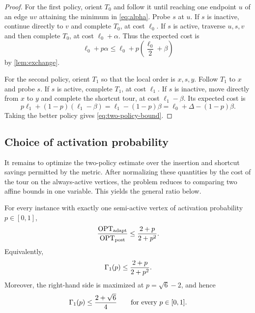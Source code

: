 \documentclass[12pt,a4paper,oneside]{report}
\begin{document}
\begin{proof}
For the first policy, orient $T_0$ and follow it until reaching one endpoint
$u$ of an edge $uv$ attaining the minimum in \cref{eq:alpha}.  Probe $s$ at
$u$.  If $s$ is inactive, continue directly to $v$ and complete $T_0$, at cost
$\ell_0$.  If $s$ is active, traverse $u,s,v$ and then complete $T_0$, at cost
$\ell_0+\alpha$.  Thus the expected cost is
\[
  \ell_0+p\alpha
  \le \ell_0+p\left(\frac{\ell_0}{2}+\beta\right)
\]
by \cref{lem:exchange}.

For the second policy, orient $T_1$ so that the local order is
$x,s,y$.  Follow $T_1$ to $x$ and probe $s$.  If $s$ is active, complete
$T_1$, at cost $\ell_1$.  If $s$ is inactive, move directly from $x$ to $y$ and
complete the shortcut tour, at cost $\ell_1-\beta$.  Its expected cost is
\[
  p\ell_1+(1-p)(\ell_1-\beta)
  =\ell_1-(1-p)\beta
  =\ell_0+\Delta-(1-p)\beta.
\]
Taking the better policy gives \cref{eq:two-policy-bound}.
\end{proof}

\subsection{Choice of activation probability}\label{sec:one-stochastic-optimization}

It remains to optimize the two-policy estimate over the insertion and
shortcut savings permitted by the metric.  After normalizing these quantities
by the cost of the tour on the always-active vertices, the problem reduces to
comparing two affine bounds in one variable.  This yields the general ratio
below.

\begin{theorem}\label{thm:general-upper}
For every instance with exactly one semi-active vertex of activation
probability $p\in[0,1]$,
\[
  \frac{\operatorname{OPT}_\mathrm{adapt}}{\operatorname{OPT}_\mathrm{post}}
  \le\frac{2+p}{2+p^2}.
\]
Equivalently,
\[
  \Gamma_{1}(p)\le\frac{2+p}{2+p^2}.
\]
Moreover, the right-hand side is maximized at $p=\sqrt6-2$, and hence
\[
  \Gamma_{1}(p)\le\frac{2+\sqrt6}{4}
  \qquad\text{for every }p\in[0,1].
\]
\end{theorem}
\end{document}
